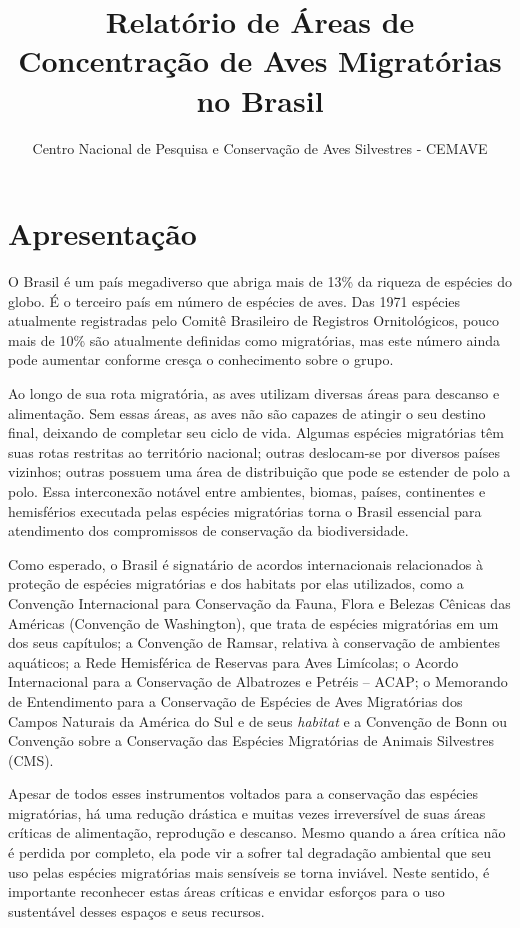 \documentclass[
  oneside]{scrbook}
\title{Relatório de Áreas de Concentração de Aves Migratórias no Brasil}
\author{Centro Nacional de Pesquisa e Conservação de Aves Silvestres - CEMAVE}
\date{}
\begin{document}

\maketitle

{
\setcounter{tocdepth}{1}
\tableofcontents
}
\pagestyle{plain}

\hypertarget{apresentacao}{%
\chapter*{Apresentação}\label{apresentacao}}

O Brasil é um país megadiverso que abriga mais de 13\% da riqueza de espécies do globo. É o terceiro país em número de espécies de aves. Das 1971 espécies atualmente registradas pelo Comitê Brasileiro de Registros Ornitológicos, pouco mais de 10\% são atualmente definidas como migratórias, mas este número ainda pode aumentar conforme cresça o conhecimento sobre o grupo.

Ao longo de sua rota migratória, as aves utilizam diversas áreas para descanso e alimentação. Sem essas áreas, as aves não são capazes de atingir o seu destino final, deixando de completar seu ciclo de vida. Algumas espécies migratórias têm suas rotas restritas ao território nacional; outras deslocam-se por diversos países vizinhos; outras possuem uma área de distribuição que pode se estender de polo a polo. Essa interconexão notável entre ambientes, biomas, países, continentes e hemisférios executada pelas espécies migratórias torna o Brasil essencial para atendimento dos compromissos de conservação da biodiversidade.

Como esperado, o Brasil é signatário de acordos internacionais relacionados à proteção de espécies migratórias e dos habitats por elas utilizados, como a Convenção Internacional para Conservação da Fauna, Flora e Belezas Cênicas das Américas (Convenção de Washington), que trata de espécies migratórias em um dos seus capítulos; a Convenção de Ramsar, relativa à conservação de ambientes aquáticos; a Rede Hemisférica de Reservas para Aves Limícolas; o Acordo Internacional para a Conservação de Albatrozes e Petréis -- ACAP; o Memorando de Entendimento para a Conservação de Espécies de Aves Migratórias dos Campos Naturais da América do Sul e de seus \emph{habitat} e a Convenção de Bonn ou Convenção sobre a Conservação das Espécies Migratórias de Animais Silvestres (CMS).

Apesar de todos esses instrumentos voltados para a conservação das espécies migratórias, há uma redução drástica e muitas vezes irreversível de suas áreas críticas de alimentação, reprodução e descanso. Mesmo quando a área crítica não é perdida por completo, ela pode vir a sofrer tal degradação ambiental que seu uso pelas espécies migratórias mais sensíveis se torna inviável. Neste sentido, é importante reconhecer estas áreas críticas e envidar esforços para o uso sustentável desses espaços e seus recursos.
\end{document}
